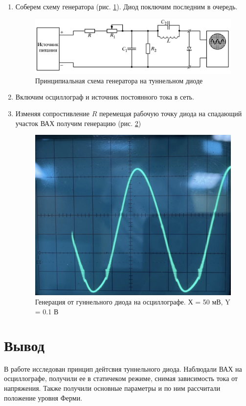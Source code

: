 \documentclass[a4paper]{article}
\begin{document}
\begin{enumerate}
    \item Соберем схему генератора (рис. \ref{gen}). Диод поключим последним в очередь.

        \begin{figure}[h]
            \begin{center}
                \includegraphics[scale = 0.8]{gen.png}
                \caption{Принципиальная схема генератора на туннельном диоде}
                \label{gen}
            \end{center}
        \end{figure}

    \item Включим осциллограф и источник постоянного тока в сеть.
    \item Изменяя сопростивление $R$ перемещая рабочую точку диода на спадающий участок ВАХ получим генерацию (рис. \ref{gen1})

    \begin{figure}[H]
        \begin{center}
            \includegraphics[scale = 0.2]{gen1.jpg}
            \caption{Генерация от гуннельного диода на осциллографе. Х = 50 мВ, Y = 0.1 В}
            \label{gen1}
        \end{center}
    \end{figure}

\end{enumerate}


\section{Вывод}
В работе исследован принцип дейтсвия туннельного диода. Наблюдали ВАХ на осциллографе, получили ее в статичеком режиме, снимая зависимость тока от напряжения. Также 
получили основные параметры и по ним рассчитали положение уровня Ферми.
\end{document}

